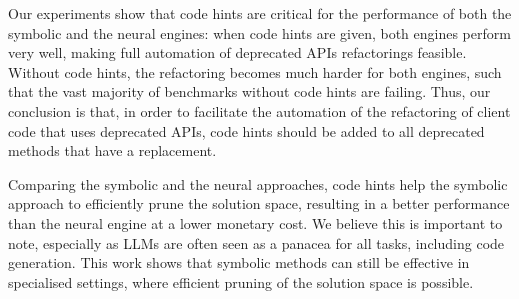 \documentclass[sigconf,review,anonymous]{acmart}
\begin{document}
Our experiments show that code hints are critical for the performance of
both the symbolic and the neural engines: when code hints are given, both
engines perform very well, making full automation of deprecated APIs
refactorings feasible.  Without code hints, the refactoring becomes much
harder for both engines, such that the vast majority of benchmarks without
code hints are failing.  Thus, our conclusion is that, in order to
facilitate the automation of the refactoring of client code that uses
deprecated APIs, code hints should be added to all deprecated methods that
have a replacement.

Comparing the symbolic and the neural approaches, code hints help the
symbolic approach to efficiently prune the solution space, resulting in a
better performance than the neural engine at a lower monetary cost.  We
believe this is important to note, especially as LLMs are often seen as a
panacea for all tasks, including code generation.  This work shows that
symbolic methods can still be effective in specialised settings, where
efficient pruning of the solution space is possible.





\end{document}
